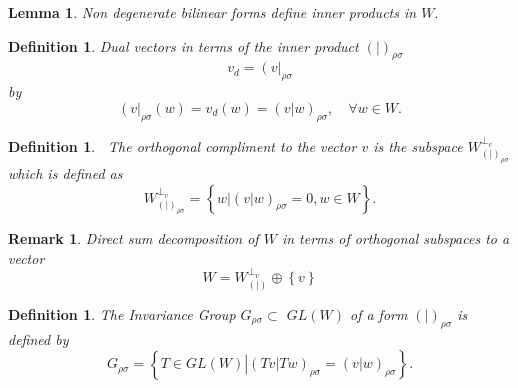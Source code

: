 \documentclass[aps,preprint]{revtex4}
\newtheorem{definition}[theorem]{Definition}
\newtheorem{lemma}[theorem]{Lemma}
\newtheorem{remark}[theorem]{Remark}
\begin{document}
\begin{lemma}
\emph{Non degenerate} bilinear forms define inner products in $W.$
\end{lemma}

\begin{definition}
Dual vectors in terms of the inner product $\left( \left. {}\right\vert
\right) _{\rho \sigma }$ 
\begin{equation}
v_{d}=\left( v\right\vert _{\rho \sigma }
\end{equation}%
by 
\begin{equation}
\left( v\right\vert _{\rho \sigma }\left( w\right) =v_{d}\left( w\right)
=\left( \left. v\right\vert w\right) _{\rho \sigma },\quad \forall w\in W.
\end{equation}
\end{definition}

\begin{definition}
\textbf{\ }The orthogonal compliment to the vector $v$ is the subspace $%
W_{\left( \left. {}\right\vert \right) _{\rho \sigma }}^{\bot _{v}}$ which
is defined as 
\begin{equation}
W_{\left( \left. {}\right\vert \right) _{\rho \sigma }}^{\bot _{v}}=\left\{
\left. \overset{}{w}\right\vert \left( \left. \overset{}{v}\right\vert
w\right) _{\rho \sigma }=0,w\in W\right\} .
\end{equation}
\end{definition}

\begin{remark}
Direct sum decomposition of $W$ in terms of orthogonal subspaces to a vector 
\begin{equation}
W=W_{\left( \left. {}\right\vert \right) }^{\bot _{v}}\oplus \left\{
v\right\}
\end{equation}
\end{remark}

\begin{definition}
The Invariance Group $G_{\rho \sigma }\subset $ $GL\left( W\right) $ of a
form $\left( \left. {}\right\vert \right) _{\rho \sigma }$ is defined by 
\begin{equation}
G_{\rho \sigma }=\left\{ \left. \overset{}{T\in GL\left( W\right) }%
\right\vert \left( \left. Tv\right\vert Tw\right) _{\rho \sigma }=\left(
\left. v\right\vert w\right) _{\rho \sigma }\right\} .
\end{equation}
\end{definition}
\end{document}

